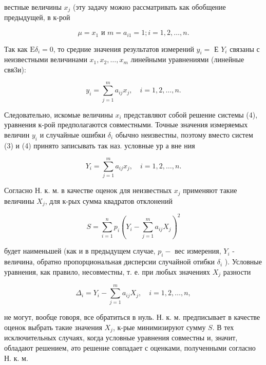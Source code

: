 \documentclass[10pt]{article}
\begin{document}
вестные величины $x_{j}$ (эту задачу можно рассматривать как обобщение предыдущей, в к-рой



\[

\mu=x_{1} \text { и } m=a_{i 1}=1 ; i=1,2, \ldots, n .

\]



Так как $\mathrm{E} \delta_{i}=0$, то средние значения результатов измерений $y_{i}=$ Е $Y_{i}$ связаны с неизвестными величинами $x_{1}, x_{2}, \ldots, x_{m}$ линейными уравнениями (линейные свя3и):



\[

y_{i}=\sum_{j=1}^{m} a_{i j} x_{j}, \quad i=1,2, \ldots, n .

\]



Следовательно, искомые величины $x_{i}$ представляют собой решение системы (4), уравнения к-рой предполагаются совместными. Точные значения измеряемых величин $y_{i}$ и случайные ошибки $\delta_{i}$ обычно неизвестны, поэтому вместо систем (3) и (4) принято записывать так наз. условные ур а вне ния



\[

Y_{i}=\sum_{j=1}^{m} a_{i j} x_{j}, \quad i=1,2, \ldots, n .

\]



Согласно Н. к. м. в качестве оценок для неизвестных $x_{j}$ применяют такие величины $X_{j}$, для к-рых сумма квадратов отклонений



\[

S=\sum_{i=1}^{n} p_{i}\left(Y_{i}-\sum_{j=1}^{m} a_{i j} X_{j}\right)^{2}

\]



будет наименьшей (как и в предыдущем случае, $p_{i}-$ вес измерения, $Y_{i}$ - величина, обратно пропорциональная дисперсии случайной отибки $\delta_{i}$ ). Условные уравнения, как правило, несовместны, т. е. при любых значениях $X_{j}$ разности



\[

\Delta_{i}=Y_{i}-\sum_{j=1}^{m} a_{i j} X_{j}, \quad i=1,2, \ldots, n,

\]



не могут, вообце говоря, все обратиться в нуль. Н. к. м. предписывает в качестве оценок выбрать такие значения $X_{j}$, к-рые минимизируют сумму $S$. В тех исключительных случаях, когда условные уравнения совместны и, значит, обладают решением, әто решение совпадает с оценками, полученными согласно Н. к. м.
\end{document}
